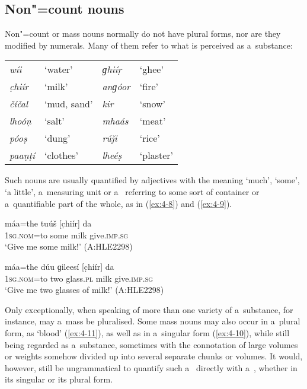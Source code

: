 \subsection{Non"=count nouns}
\label{subsec:4-4-1}


Non"=count or mass nouns normally do not have plural forms, nor are they modified by numerals. Many of them refer to what is perceived as a~substance:



\begin{table}[H]
\begin{tabularx}{\textwidth}{ Q Q Q Q }
\textit{wíi} &
`water' &
\textit{ɡhiíṛ} &
`ghee'\\
\textit{c̣hiír} &
`milk' &
\textit{anɡóor} &
`fire'\\
\textit{číčal} &
`mud, sand' &
\textit{kir} &
`snow'\\
\textit{lhoóṇ} &
`salt' &
\textit{mhaás} &
`meat'\\
\textit{póoṣ} &
`dung' &
\textit{rúǰi} &
`rice'\\
\textit{paaṇṭí} &
`clothes' &
\textit{lheéṣ} &
`plaster'\\
\end{tabularx}
\end{table}

Such nouns are usually quantified by adjectives with the meaning `much', `some', `a little', a~measuring unit or a~ referring to some sort of container or a~quantifiable part of the whole, as in (\ref{ex:4-8}) and (\ref{ex:4-9}). 

\begin{exe}
\ex
\label{ex:4-8}
\gll máa=the tuúš [c̣hiír] da \\
	\textsc{1sg.nom}=to some milk give.\textsc{imp.sg} \\
\glt `Give me some milk!' (A:HLE2298)
\end{exe}

\begin{exe}
\ex
\label{ex:4-9}
\gll máa=the dúu ɡileesí [c̣hiír] da \\
	\textsc{1sg.nom}=to two glass.\textsc{pl} milk give.\textsc{imp.sg} \\
\glt `Give me two glasses of milk!' (A:HLE2298)
\end{exe}

Only exceptionally, when speaking of more than one variety of a~substance, for instance, may a~mass  be pluralised. Some mass nouns may also occur in a~plural form, as `blood' (\ref{ex:4-11}), as well as in a~singular form (\ref{ex:4-10}), while still being regarded as a~substance, sometimes with the connotation of large volumes or weights somehow divided up into several separate chunks or volumes. It would, however, still be ungrammatical to quantify such a~ directly with a~, whether in its singular or its plural form.


